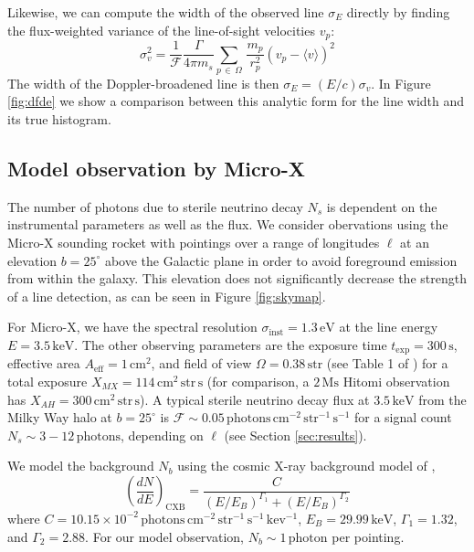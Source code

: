 \documentclass[aps,prl,10pt,twocolumn,superscriptaddress,showpacs]{revtex4-1}
\newcommand{\units}[1]{\,\mathrm{#1}}
\begin{document}
Likewise, we can compute the width of the observed line $\sigma_E$ directly by finding the flux-weighted
variance of the line-of-sight velocities $v_p$:
\begin{equation} 
	\sigma_v^2 =\frac{1}{\mathcal{F}} \frac{\Gamma}{4\pi m_s} \sum_{p \, \in \, \Omega}
	\, \frac{m_p}{r_p^{2}} \left(v_p-\langle v\rangle\right)^2 
\label{eq:simsigma}
\end{equation}
The width of the Doppler-broadened line is then $\sigma_E = (E/c) \sigma_v$. In Figure \ref{fig:dfde} we show a comparison 
between this analytic form for the line width and its true histogram.


\subsection{Model observation by Micro-X}
\label{sec:microx}

The number of photons due to sterile neutrino decay $N_s$ is dependent on the instrumental
parameters as well as the flux. We consider obervations using the Micro-X sounding rocket \cite{Figueroa-Feliciano:2015gwa}
with pointings over a range of longitudes $\ell$ at an elevation $b=25^\circ$
above the Galactic plane in order to avoid foreground emission from within the galaxy. This
elevation does not significantly decrease the strength of a line detection, as can be seen in Figure
\ref{fig:skymap}.

For Micro-X, we have the spectral resolution $\sigma_\mathrm{inst}=1.3\units{eV}$ at the line energy
$E=3.5\units{keV}$. The other observing parameters are the exposure time $t_\mathrm{exp} = 300
\units{s}$, effective area $A_\mathrm{eff}=1\units{cm^2}$, and field of view
$\Omega=0.38\units{str}$ (see Table 1 of \cite{Figueroa-Feliciano:2015gwa}) for a
total exposure $X_{MX} = 114 \units{cm^2\,str\,s}$ (for comparison, a $2\units{Ms}$ Hitomi
observation has $X_{AH} = 300 \units{cm^2\,str\,s}$). A typical sterile neutrino decay flux at $3.5\units{keV}$ from
the Milky Way halo at $b=25^\circ$ is $\mathcal{F}\sim 0.05 \units{photons\,cm^{-2}\,str^{-1}\,s^{-1}}$ 
for a signal count $N_s \sim 3-12 \units{photons}$, depending on $\ell$ (see Section
\ref{sec:results}). 

We model the background $N_b$ using the cosmic X-ray background model of \cite{ajello2008},
$$
\left( \frac{dN}{dE} \right)_\mathrm{CXB} = \frac{C}{(E/E_B)^{\Gamma_1}+(E/E_B)^{\Gamma_2}}
$$
where $C=10.15\times 10^{-2} \units{photons\,cm^{-2}\,str^{-1}\,s^{-1}\,kev^{-1}}$,
$E_B=29.99\units{keV}$,
$\Gamma_1=1.32$, and $\Gamma_2=2.88$. For our model observation, $N_b \sim 1 \units{photon}$ per
pointing. 
\end{document}
